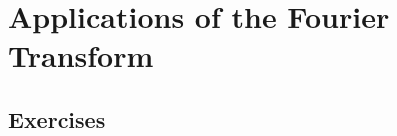 \section{Applications of the Fourier Transform}
\label{appFourierTransform:section}


\LO{

}


\subsection{Exercises}










